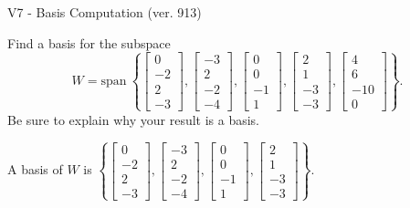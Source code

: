 \begin{exercise}
  \begin{exerciseTitle}V7 - Basis Computation (ver. 913)\end{exerciseTitle}
  \begin{exerciseStatement}
    Find a basis for the subspace 
\[W=\mathrm{span}\ \left\{\left[\begin{array}{r}
0 \\
-2 \\
2 \\
-3
\end{array}\right] , \left[\begin{array}{r}
-3 \\
2 \\
-2 \\
-4
\end{array}\right] , \left[\begin{array}{r}
0 \\
0 \\
-1 \\
1
\end{array}\right] , \left[\begin{array}{r}
2 \\
1 \\
-3 \\
-3
\end{array}\right] , \left[\begin{array}{r}
4 \\
6 \\
-10 \\
0
\end{array}\right]\right\}.\]
 Be sure to explain why your result is a basis.


  \end{exerciseStatement}
  \begin{exerciseAnswer}
   A basis of \(W\) is  \(\left\{\left[\begin{array}{r}
0 \\
-2 \\
2 \\
-3
\end{array}\right] , \left[\begin{array}{r}
-3 \\
2 \\
-2 \\
-4
\end{array}\right] , \left[\begin{array}{r}
0 \\
0 \\
-1 \\
1
\end{array}\right] , \left[\begin{array}{r}
2 \\
1 \\
-3 \\
-3
\end{array}\right]\right\}\).
  


  \end{exerciseAnswer}
\end{exercise}
